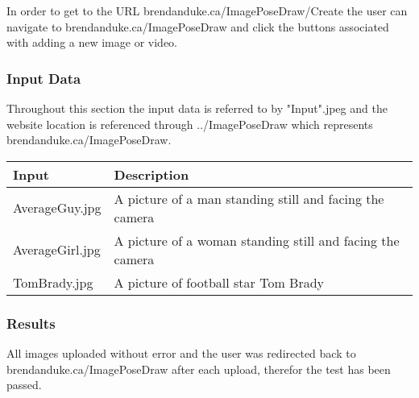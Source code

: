 \documentclass{scrreprt}
\begin{document}
In order to get to the URL brendanduke.ca/ImagePoseDraw/Create the user can navigate to brendanduke.ca/ImagePoseDraw and click the buttons associated with adding a new image or video.

\subsubsection{Input Data}

Throughout this section the input data is referred to by "Input".jpeg and the website location is referenced through ../ImagePoseDraw which represents brendanduke.ca/ImagePoseDraw.

\begin{table}[H]
        \centering
        \begin{tabular}{p{3cm}p{6cm}}
                \hline\hline
                Input & Description\\
                \hline\hline
                AverageGuy.jpg &  A picture of a man standing still and facing the camera\\ %
                \hline
                AverageGirl.jpg &  A picture of a woman standing still and facing the camera\\ %
                \hline
                TomBrady.jpg &  A picture of football star Tom Brady\\ %
                \hline
        \end{tabular}
\end{table}

\subsubsection{Results}

All images uploaded without error and the user was redirected back to brendanduke.ca/ImagePoseDraw after each upload, therefor the test has been passed.
\end{document}
